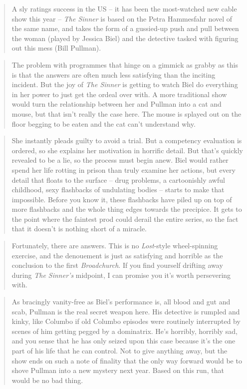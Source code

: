 \documentclass[
  letterpaper,
  DIV=11,
  numbers=noendperiod]{scrartcl}
\begin{document}
\begin{quote}
A sly ratings success in the US -- it has been the most-watched new
cable show this year -- \emph{The Sinner} is based on the Petra
Hammesfahr novel of the same name, and takes the form of a gussied-up
push and pull between the woman (played by Jessica Biel) and the
detective tasked with figuring out this mess (Bill Pullman).
\end{quote}

\begin{quote}
The problem with programmes that hinge on a gimmick as grabby as this is
that the answers are often much less satisfying than the inciting
incident. But the joy of \emph{The Sinner} is getting to watch Biel do
everything in her power to just get the ordeal over with. A more
traditional show would turn the relationship between her and Pullman
into a cat and mouse, but that isn't really the case here. The mouse is
splayed out on the floor begging to be eaten and the cat can't
understand why.
\end{quote}

\begin{quote}
She instantly pleads guilty to avoid a trial. But a competency
evaluation is ordered, so she explains her motivation in horrific
detail. But that's quickly revealed to be a lie, so the process must
begin anew. Biel would rather spend her life rotting in prison than
truly examine her actions, but every detail that floats to the surface
-- drug problems, a cartoonishly awful childhood, sexy flashbacks of
undulating bodies -- starts to make that impossible. Before you know it,
these flashbacks have piled up on top of more flashbacks and the whole
thing edges towards the precipice. It gets to the point where the
faintest prod could derail the entire series, so the fact that it
doesn't is nothing short of a miracle.
\end{quote}

\begin{quote}
Fortunately, there are answers. This is no \emph{Lost}-style
wheel-spinning exercise, and the denouement is just as satisfying and
horrible as the conclusion to the first \emph{Broadchurch}. If you find
yourself drifting away during \emph{The Sinner's} midpoint, I can
promise you it's worth persevering with.
\end{quote}

\begin{quote}
As bracingly vanity-free as Biel's performance is, all blood and gut and
scab, Pullman is the real secret weapon here. His detective is rumpled
and kinky, like Columbo if old Columbo episodes were routinely
interrupted by scenes of him getting pegged by a dominatrix. He's
horribly, horribly sad, and you sense that he has only seized upon this
case because it's the one part of his life that he can control. Not to
give anything away, but the show ends on such a note of finality that
the only way forward would be to shove Pullman into a new mystery next
year. Based on this run, that would be no bad thing.
\end{quote}
\end{document}
